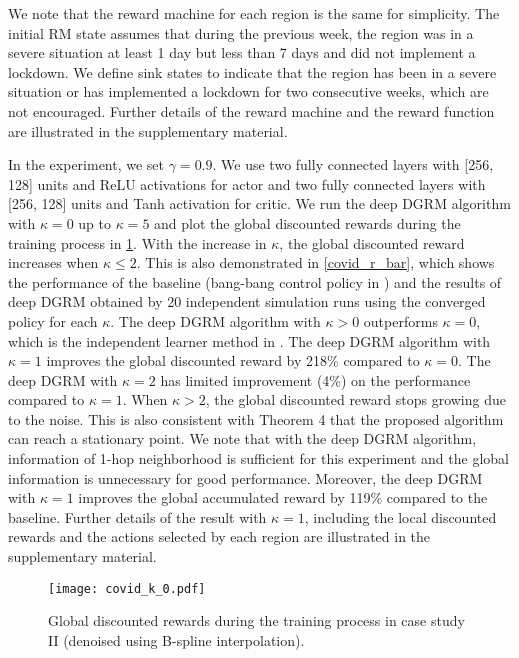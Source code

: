 \documentclass[conf]{new-aiaa}
\def\foo ABC{DGRM}
\begin{document}
We note that the reward machine for each region is the same for simplicity. The initial RM state assumes that during the previous week, the region was in a severe situation at least 1 day but less than 7 days and did not implement a lockdown. We define sink states to indicate that the region has been in a severe situation or has implemented a lockdown for two consecutive weeks, which are not encouraged. Further details of the reward machine and the reward function are illustrated in the supplementary material.



In the experiment, we set $\gamma = 0.9$. We use two fully connected layers with [256, 128] units and ReLU activations for actor and two fully connected layers with [256, 128] units and Tanh activation for critic. We run the deep \foo ABC algorithm with $\kappa = 0$ up to $\kappa = 5$ and plot the global discounted rewards during the training process in \cref{covid_k}. With the increase in $\kappa$, the global discounted reward increases when $\kappa \le 2$. This is also demonstrated in \cref{covid_r_bar}, which shows the performance of the baseline (bang-bang control policy in \cite{della2020intermittent}) and the results of deep \foo ABC obtained by 20 independent simulation runs using the converged policy for each $\kappa$. The deep \foo ABC algorithm with $\kappa > 0$ outperforms $\kappa = 0$, which is the independent learner method in \cite{tan1993multi}. The deep \foo ABC algorithm with $\kappa=1$ improves the global discounted reward by 218\% compared to $\kappa=0$. The deep \foo ABC with $\kappa=2$ has limited improvement (4\%) on the performance compared to $\kappa=1$. When $\kappa>2$, the global discounted reward stops growing due to the noise. This is also consistent with Theorem 4 that the proposed algorithm can reach a stationary point. We note that with the deep \foo ABC algorithm, information of 1-hop neighborhood is sufficient for this experiment and the global information is unnecessary for good performance. Moreover, the deep \foo ABC with $\kappa =1 $ improves the global accumulated reward by 119\% compared to the baseline. Further details of the result with $\kappa =1 $, including the local discounted rewards and the actions selected by each region are illustrated in the supplementary material.

\begin{figure}[H]
\centering
\texttt{[image: covid\_k\_0.pdf]}
\caption{Global discounted rewards during the training process in case study II (denoised using B-spline interpolation).}
\label{covid_k}
\end{figure}
\end{document}
